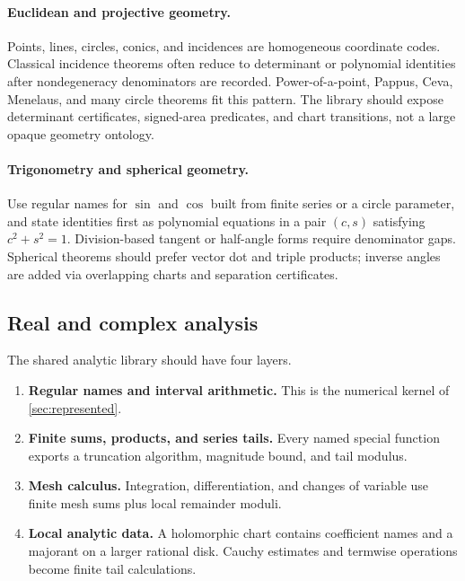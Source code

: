 \paragraph{Euclidean and projective geometry.}
Points, lines, circles, conics, and incidences are homogeneous coordinate
codes.  Classical incidence theorems often reduce to determinant or polynomial
identities after nondegeneracy denominators are recorded.  Power-of-a-point,
Pappus, Ceva, Menelaus, and many circle theorems fit this pattern.  The library
should expose determinant certificates, signed-area predicates, and chart
transitions, not a large opaque geometry ontology.

\paragraph{Trigonometry and spherical geometry.}
Use regular names for \(\sin\) and \(\cos\) built from finite series or a
circle parameter, and state identities first as polynomial equations in a
pair \((c,s)\) satisfying \(c^2+s^2=1\).  Division-based tangent or half-angle
forms require denominator gaps.  Spherical theorems should prefer vector dot
and triple products; inverse angles are added via overlapping charts and
separation certificates.

\subsection{Real and complex analysis}

The shared analytic library should have four layers.

\begin{enumerate}
\item \textbf{Regular names and interval arithmetic.}  This is the numerical
      kernel of \cref{sec:represented}.
\item \textbf{Finite sums, products, and series tails.}  Every named special
      function exports a truncation algorithm, magnitude bound, and tail
      modulus.
\item \textbf{Mesh calculus.}  Integration, differentiation, and changes of
      variable use finite mesh sums plus local remainder moduli.
\item \textbf{Local analytic data.}  A holomorphic chart contains coefficient
      names and a majorant on a larger rational disk.  Cauchy estimates and
      termwise operations become finite tail calculations.
\end{enumerate}

